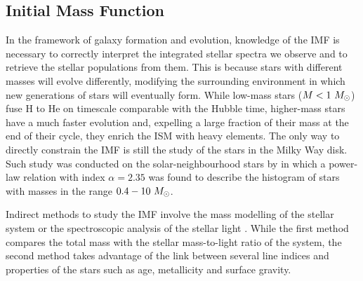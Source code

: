 \subsection{Initial Mass Function}\label{sec:IMF} 
	In the framework of galaxy formation and evolution, knowledge of the IMF is necessary to correctly interpret the 
	integrated stellar spectra we observe and to retrieve the stellar populations from them. 
	This is because stars with different masses will evolve differently, modifying the surrounding environment in which 
	new generations of stars will eventually form. 
	While low-mass stars ($M<1~M_{\rm{\odot}}$) fuse H to He on timescale comparable with the Hubble time, 
	higher-mass stars have a much faster evolution and, expelling a large fraction of their mass at the end of their 
	cycle, they enrich the ISM with heavy elements. 
	The only way to directly constrain the IMF is still the study of the stars in the Milky Way disk. 
	Such study was conducted on the solar-neighbourhood stars by \citet{Salpeter55} in which 
	a power-law relation with index $\alpha=2.35$ was found to describe the histogram of 
	stars with masses in the range $0.4-10~M_{\rm{\odot}}$.
	
	Indirect methods to study the IMF involve the mass modelling of the stellar system \citep{Cappellari06, Thomas11} or the 
	spectroscopic analysis of the stellar light \citep{Cohen78, Faber80}. 
	While the first method compares the total mass with the stellar mass-to-light ratio of the system, the second method takes advantage of 
	the link between several line indices and properties of the stars such as age, metallicity and surface gravity. 
		
